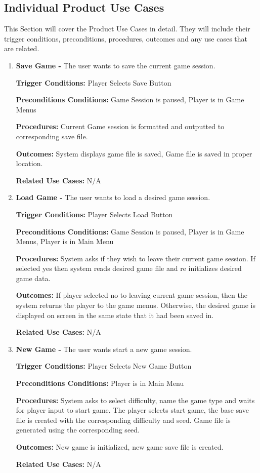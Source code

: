 \documentclass{article}
\begin{document}
\subsection{Individual Product Use Cases}
\quad This Section will cover the Product Use Cases in detail. They will include their trigger conditions, preconditions, procedures, outcomes and any use cases that are related.
\begin{enumerate}[{PUC}1. ]
	\item \textbf{Save Game -} The user wants to save the current game session.\par
\textbf{Trigger Conditions: }Player Selects Save Button \par
\textbf{Preconditions Conditions: }Game Session is paused, Player is in Game Menus \par
\textbf{Procedures: }Current Game session is formatted and outputted to corresponding save file. \par
\textbf{Outcomes: }System displays game file is saved, Game file is saved in proper location.  \par
\textbf{Related Use Cases: }N/A \par

	\item \textbf{Load Game -} The user wants to load a desired game session.\par
\textbf{Trigger Conditions: }Player Selects Load Button \par
\textbf{Preconditions Conditions: }Game Session is paused, Player is in Game Menus, Player is in Main Menu \par
\textbf{Procedures: }System asks if they wish to leave their current game session. If selected yes then system reads desired game file and re initializes desired game data.\par
\textbf{Outcomes: }If player selected no to leaving current game session, then the system returns the player to the game menus. Otherwise, the desired game is displayed on screen in the same state that it had been saved in. \par
\textbf{Related Use Cases: }N/A  \par

	\item \textbf{New Game -} The user wants start a new game session.\par
\textbf{Trigger Conditions: }Player Selects New Game Button \par
\textbf{Preconditions Conditions: }Player is in Main Menu \par
\textbf{Procedures: }System asks to select difficulty, name the game type and waits for player input to start game. The player selects start game, the base save file is created with the corresponding difficulty and seed. Game file is generated using the corresponding seed. \par
\textbf{Outcomes: }New game is initialized, new game save file is created. \par
\textbf{Related Use Cases: }N/A \par


\end{enumerate}
\end{document}
